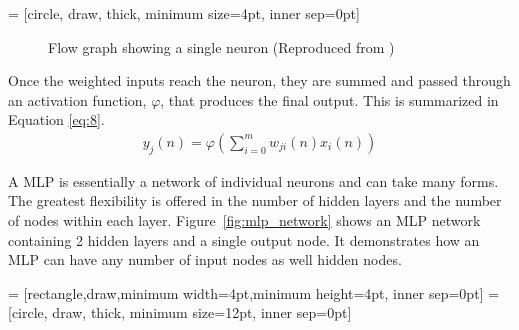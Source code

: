 \documentclass[11pt,letterpaper,titlepage]{article}
\numberwithin{equation}{section}
\numberwithin{figure}{section}
\numberwithin{table}{section}
\begin{document}
 = [circle, draw, thick, minimum size=4pt, inner sep=0pt]
\begin{figure}[!ht]
\centering
{}
\caption{Flow graph showing a single neuron (Reproduced from \cite{Haykin2008})}
\label{fig:neuron}
\end{figure}

Once the weighted inputs reach the neuron, they are summed and passed through an activation function, \(\varphi\), that produces the final output. This is summarized in Equation \eqref{eq:8}.
\begin{gather}
	\label{eq:8}
	y_j(n) = \varphi \left( \sum_{i=0}^m w_{ji}(n)x_i(n)\right)
\end{gather}

A MLP is essentially a network of individual neurons and can take many forms. The greatest flexibility is offered in the number of hidden layers and the number of nodes within each layer. Figure~\ref{fig:mlp_network} shows an MLP network containing 2 hidden layers and a single output node. It demonstrates how an MLP can have any number of input nodes as well hidden nodes.

 = [rectangle,draw,minimum width=4pt,minimum height=4pt, inner sep=0pt]
 = [circle, draw, thick, minimum size=12pt, inner sep=0pt]
\end{document}
